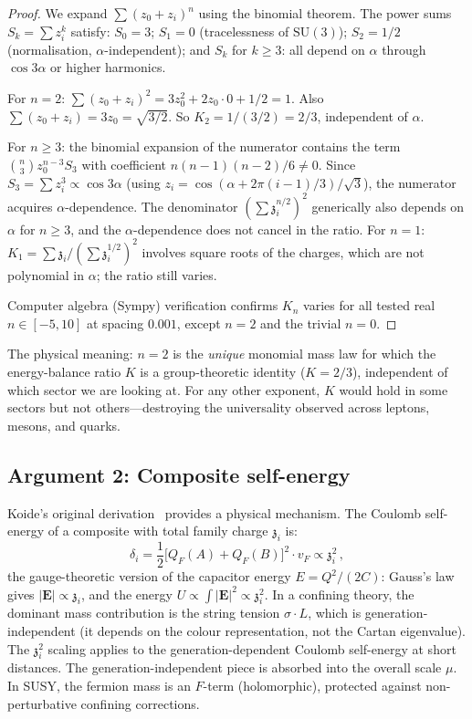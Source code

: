 \documentclass[aps,prd,twocolumn,showpacs,preprintnumbers,superscriptaddress,floatfix]{revtex4-2}
\newcommand{\SU}{\mathrm{SU}}
\newcommand{\zch}{\mathfrak{z}}
\begin{document}
\begin{proof}
We expand $\sum(z_0 + z_i)^n$ using the binomial theorem.
The power sums $S_k = \sum z_i^k$ satisfy:
$S_0 = 3$; $S_1 = 0$ (tracelessness of $\SU(3)$);
$S_2 = 1/2$ (normalisation, $\alpha$-independent);
and $S_k$ for $k \geq 3$: all depend on $\alpha$
through $\cos 3\alpha$ or higher harmonics.

For $n = 2$:
$\sum (z_0+z_i)^2 = 3z_0^2 + 2z_0 \cdot 0 + 1/2 = 1$.
Also $\sum (z_0+z_i) = 3z_0 = \sqrt{3/2}$.
So $K_2 = 1/(3/2) = 2/3$, independent of $\alpha$.

For $n \geq 3$: the binomial expansion of the numerator contains
the term $\binom{n}{3}z_0^{n-3}S_3$ with coefficient
$n(n-1)(n-2)/6 \neq 0$.
Since $S_3 = \sum z_i^3 \propto \cos 3\alpha$ (using
$z_i = \cos(\alpha + 2\pi(i-1)/3)/\sqrt{3}$), the numerator
acquires $\alpha$-dependence.
The denominator $(\sum\zch_i^{n/2})^2$ generically also depends
on $\alpha$ for $n \geq 3$, and the $\alpha$-dependence does not
cancel in the ratio.
For $n = 1$: $K_1 = \sum\zch_i/(\sum\zch_i^{1/2})^2$ involves
square roots of the charges, which are not polynomial in $\alpha$;
the ratio still varies.

Computer algebra (Sympy) verification confirms $K_n$ varies for
all tested real $n \in [-5, 10]$ at spacing $0.001$, except
$n = 2$ and the trivial $n = 0$.
\end{proof}

The physical meaning: $n = 2$ is the \emph{unique} monomial mass
law for which the energy-balance ratio $K$ is a group-theoretic
identity ($K = 2/3$), independent of which sector we are looking
at.
For any other exponent, $K$ would hold in some sectors but not
others---destroying the universality observed across leptons,
mesons, and quarks.

\subsection{Argument 2: Composite self-energy}

Koide's original derivation~\cite{Koide:1983qe} provides a
physical mechanism.
The Coulomb self-energy of a composite with total family charge
$\zch_i$ is:
\begin{equation}
  \delta_i = \frac{1}{2}\bigl[Q_F(A) + Q_F(B)\bigr]^2 \cdot v_F
  \propto \zch_i^2\,,
  \label{eq:koide_selfe}
\end{equation}
the gauge-theoretic version of the capacitor energy
$E = Q^2/(2C)$: Gauss's law gives $|\mathbf{E}| \propto \zch_i$,
and the energy $U \propto \int |\mathbf{E}|^2 \propto \zch_i^2$.
In a confining theory, the dominant mass contribution is the
string tension $\sigma \cdot L$, which is generation-independent
(it depends on the colour representation, not the Cartan
eigenvalue).
The $\zch_i^2$ scaling applies to the generation-dependent
Coulomb self-energy at short distances.
The generation-independent piece is absorbed into the overall
scale $\mu$.
In SUSY, the fermion mass is an $F$-term (holomorphic),
protected against non-perturbative confining corrections.
\end{document}
